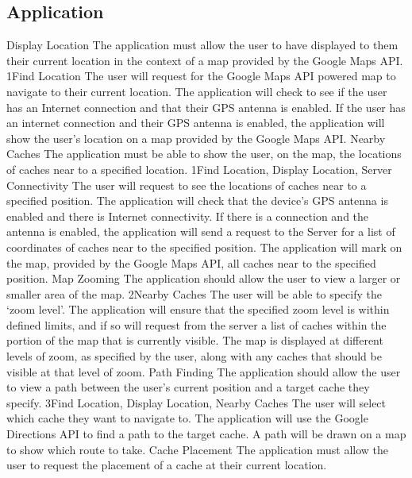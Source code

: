 	\subsection{Application} %
		\funcreq %
			{Display Location}
			{The application must allow the user to have displayed to them
			their current location in the context of a map provided by the
			Google Maps API.}
			{1}{Find Location}
			{The user will request for the Google Maps API powered map to 
			navigate to their current location.}
			{The application will check to see if the user has an Internet 
			connection and that their GPS antenna is enabled.}
			{If the user has an internet connection and their GPS antenna is 
			enabled, the application will show the user's location on a map 
			provided by the Google Maps API.}
		\funcreq %
			{Nearby Caches}
			{The application must be able to show the user, on the map, the 
			locations of caches near to a specified location.}
			{1}{Find Location, Display Location, Server Connectivity}
			{The user will request to see the locations of caches near to
			a specified position.}
			{The application will check that the device's GPS antenna is 
			enabled and there is Internet connectivity. If there is a
			connection and the antenna is enabled, the application will send a
			request to the Server for a list of coordinates of caches near to
			the specified position.}
			{The application will mark on the map, provided by the Google Maps 
			API, all caches near to the specified position.}
		\funcreq %
			{Map Zooming}
			{The application should allow the user to view a larger or smaller 
			area of the map.}
			{2}{Nearby Caches}
			{The user will be able to specify the `zoom level'.}
			{The application will ensure that the specified zoom level is
			within defined limits, and if so will request from the server a
			list of caches within the portion of the map that is currently
			visible.}
			{The map is displayed at different levels of zoom, as specified by 
			the user, along with any caches that should be visible at that
			level of zoom.}
		\funcreq %
			{Path Finding}
			{The application should allow the user to view a path between the 
			user's current position and a target cache they specify.}
			{3}{Find Location, Display Location, Nearby Caches}
			{The user will select which cache they want to navigate to.}
			{The application will use the Google Directions API to find a path 
			to the target cache.}
			{A path will be drawn on a map to show which route to take.}
		\funcreq %
			{Cache Placement}
			{The application must allow the user to request the placement of a 
			cache at their current location.}

